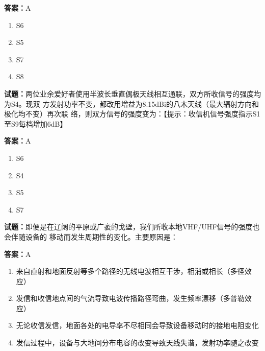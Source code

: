 \documentclass{ctexbook}
\begin{document}
\textbf{答案：}A 

\begin{enumerate}[leftmargin=3em]
  \item S6 

  \item S5 

  \item S7 

  \item S8 

\end{enumerate}





\vspace{1em}

\textbf{试题：}两位业余爱好者使用半波长垂直偶极天线相互通联，双方所收信号的强度均为S4。现双
方发射功率不变，都改用增益为8.15dBi的八木天线（最大辐射方向和极化均不变）再次联
络，则双方信号的强度变为：【提示：收信机信号强度指示S1至S9每档增加6dB】 

\textbf{答案：}A 

\begin{enumerate}[leftmargin=3em]
  \item S6 

  \item S4 

  \item S5 

  \item S7 

\end{enumerate}





\vspace{1em}

\textbf{试题：}即便是在辽阔的平原或广袤的戈壁，我们所收本地VHF/UHF信号的强度也会伴随设备的
移动而发生周期性的变化。主要原因是： 

\textbf{答案：}A 

\begin{enumerate}[leftmargin=3em]
  \item 来自直射和地面反射等多个路径的无线电波相互干涉，相消或相长（多径效应） 

  \item 发信和收信地点间的气流导致电波传播路径弯曲，发生频率漂移（多普勒效应） 

  \item 无论收信发信，地面各处的电导率不尽相同会导致设备移动时的接地电阻变化 


  \item 发信过程中，设备与大地间分布电容的改变导致天线失谐，发射功率随之改变 

\end{enumerate}
\end{document}
